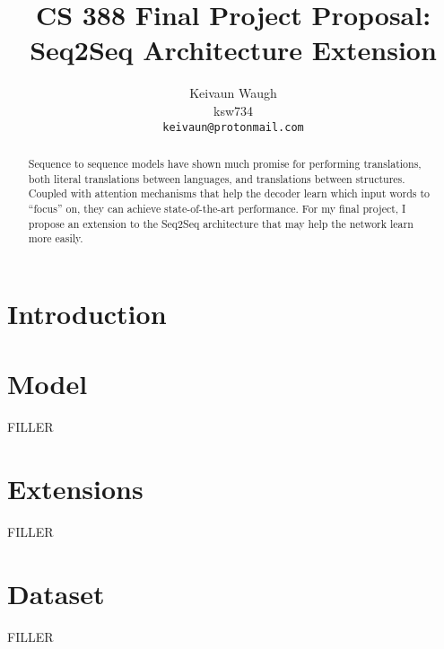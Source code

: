 \documentclass[11pt,twocolumn,letterpaper]{article}
\begin{document}
\title{
    CS 388 Final Project Proposal:
    Seq2Seq Architecture Extension\\}

\author{Keivaun Waugh\\
ksw734\\
{\tt\small keivaun@protonmail.com}
}

\maketitle

\begin{abstract}
Sequence to sequence models have shown much promise for performing translations, both literal translations between languages, and translations between structures. Coupled with attention mechanisms that help the decoder learn which input words to ``focus'' on, they can achieve state-of-the-art performance. For my final project, I propose an extension to the Seq2Seq architecture that may help the network learn more easily.
\end{abstract}

\section{Introduction}

\section{Model}
FILLER

\section{Extensions}
FILLER

\section{Dataset}
FILLER



{\small


}
\end{document}
